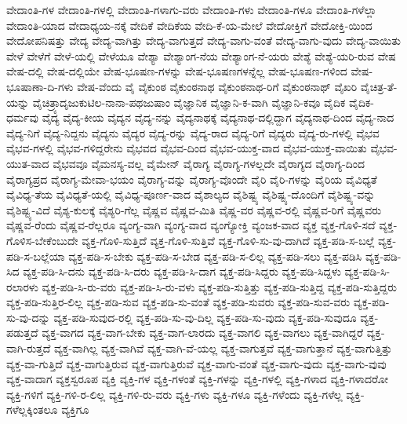 {ವೇದಾಂತಿ-ಗಳ
ವೇದಾಂತಿ-ಗಳಲ್ಲಿ
ವೇದಾಂತಿ-ಗಳಾಗು-ವರು
ವೇದಾಂತಿ-ಗಳು
ವೇದಾಂತಿ-ಗಳೂ
ವೇದಾಂತಿ-ಗಳೆಲ್ಲಾ
ವೇದಾಂತಿ-ಯಾದ
ವೇದಾಧ್ಯಯ-ನಕ್ಕೆ
ವೇದಿಕೆ
ವೇದಿಕೆಯ
ವೇದಿ-ಕೆ-ಯ-ಮೇಲೆ
ವೇದೋಕ್ತಿಗೆ
ವೇದೋಕ್ತಿ-ಯಿಂದ
ವೇದೋಪನಿಷತ್ತು
ವೇದ್ಯ
ವೇದ್ಯ-ವಾಗಿತ್ತು
ವೇದ್ಯ-ವಾಗುತ್ತದೆ
ವೇದ್ಯ-ವಾಗು-ವಂತೆ
ವೇದ್ಯ-ವಾಗು-ವುದು
ವೇದ್ಯ-ವಾಯಿತು
ವೇಳೆ
ವೇಳೆಗೆ
ವೇಳೆ-ಯಲ್ಲಿ
ವೇಳೆಯೂ
ವೇಶ್ಯಾ
ವೇಶ್ಯಾಂಗ-ನೆಯ
ವೇಶ್ಯಾಂಗ-ನೆ-ಯರು
ವೇಶ್ಯೆ
ವೇಶ್ಯೆ-ಯರಿ-ರುವ
ವೇಷ
ವೇಷ-ದಲ್ಲಿ
ವೇಷ-ದಲ್ಲಿಯೇ
ವೇಷ-ಭೂಷಣ-ಗಳನ್ನು
ವೇಷ-ಭೂಷಣಗಳನ್ನೆಲ್ಲ
ವೇಷ-ಭೂಷಣ-ಗಳಿಂದ
ವೇಷ-ಭೂಷಾಣಾ-ದಿ-ಗಳು
ವೇಷ-ವೆಂದು
ವೈ
ವೈಕುಂಠ
ವೈಕುಂಠನಾಥ
ವೈಕುಂಠನಾಥ-ರಿಗೆ
ವೈಕುಂಠನಾಥ್
ವೈಖರಿ
ವೈಚಿತ್ರ-ತೆ-ಯನ್ನು
ವೈಚಿತ್ರ್ಯಾದೃಜುಕುಟಿಲ-ನಾನಾ-ಪಥಜುಷಾಂ
ವೈಜ್ಞಾನಿಕ
ವೈಜ್ಞಾನಿ-ಕ-ವಾಗಿ
ವೈಜ್ಞಾನಿ-ಕವೂ
ವೈದಿಕ
ವೈದಿಕ-ಧರ್ಮವು
ವೈದ್ಯ
ವೈದ್ಯ-ಕೀಯ
ವೈದ್ಯನ
ವೈದ್ಯ-ನನ್ನು
ವೈದ್ಯನಾಥಕ್ಕೆ
ವೈದ್ಯನಾಥ-ದಲ್ಲಿದ್ದಾಗ
ವೈದ್ಯನಾಥ-ದಿಂದ
ವೈದ್ಯ-ನಾದ
ವೈದ್ಯ-ನಿಗೆ
ವೈದ್ಯ-ನಿದ್ದನು
ವೈದ್ಯನು
ವೈದ್ಯರ
ವೈದ್ಯ-ರನ್ನು
ವೈದ್ಯ-ರಾದ
ವೈದ್ಯ-ರಿಗೆ
ವೈದ್ಯರು
ವೈದ್ಯ-ರು-ಗಳಲ್ಲಿ
ವೈಭವ
ವೈಭವ-ಗಳಲ್ಲಿ
ವೈಭವ-ಗಳಿದ್ದರೇನು
ವೈಭವದ
ವೈಭವ-ದಿಂದ
ವೈಭವ-ಯುಕ್ತ-ವಾದ
ವೈಭವ-ಯುಕ್ತ-ವಾಯಿತು
ವೈಭವ-ಯುತ-ವಾದ
ವೈಭವವೂ
ವೈಮನಸ್ಯ-ವಲ್ಲ
ವೈಮೇನ್
ವೈರಾಗ್ಯ
ವೈರಾಗ್ಯ-ಗಳಲ್ಲದೇ
ವೈರಾಗ್ಯದ
ವೈರಾಗ್ಯ-ದಿಂದ
ವೈರಾಗ್ಯಪ್ರದ
ವೈರಾಗ್ಯ-ಮೇವಾ-ಭಯಂ
ವೈರಾಗ್ಯ-ವನ್ನು
ವೈರಾಗ್ಯ-ವೊಂದೇ
ವೈರಿ
ವೈರಿ-ಗಳನ್ನು
ವೈರಿಯ
ವೈವಿಧ್ಯತೆ
ವೈವಿಧ್ಯ-ತೆಯ
ವೈವಿಧ್ಯತೆ-ಯಲ್ಲಿ
ವೈವಿಧ್ಯ-ಪೂರ್ಣ-ವಾದ
ವೈಶಾಲ್ಯದ
ವೈಶಿಷ್ಟ್ಯ
ವೈಶಿಷ್ಟ್ಯ-ದೊಂದಿಗೆ
ವೈಶಿಷ್ಟ್ಯ-ವನ್ನು
ವೈಶಿಷ್ಟ್ಯ-ವಿದೆ
ವೈಶ್ಯ-ಕುಲಕ್ಕೆ
ವೈಶ್ಯರಿ-ಗೆಲ್ಲ
ವೈಷ್ಣವ
ವೈಷ್ಣವ-ಮಿತಿ
ವೈಷ್ಣ-ವರ
ವೈಷ್ಣವ-ರಲ್ಲಿ
ವೈಷ್ಣವ-ರಿಗೆ
ವೈಷ್ಣವರು
ವೈಷ್ಣವ-ರೆಂದು
ವೈಷ್ಣವ-ರೆಲ್ಲರೂ
ವ್ಯಂಗ್ಯ-ವಾಗಿ
ವ್ಯಂಗ್ಯ-ವಾದ
ವ್ಯಂಗ್ಯೋಕ್ತಿ
ವ್ಯಂಜಕ-ವಾದ
ವ್ಯಕ್ತ
ವ್ಯಕ್ತ-ಗೊಳಿ-ಸದೆ
ವ್ಯಕ್ತ-ಗೊಳಿಸ-ಬೇಕೆಂಬುದೇ
ವ್ಯಕ್ತ-ಗೊಳಿ-ಸುತ್ತಿದೆ
ವ್ಯಕ್ತ-ಗೊಳಿ-ಸುತ್ತಿವೆ
ವ್ಯಕ್ತ-ಗೊಳಿ-ಸು-ವು-ದಾಗಿದೆ
ವ್ಯಕ್ತ-ಪಡಿ-ಸ-ಬಲ್ಲೆ
ವ್ಯಕ್ತ-ಪಡಿ-ಸ-ಬಲ್ಲೆಯಾ
ವ್ಯಕ್ತ-ಪಡಿ-ಸ-ಬೇಕು
ವ್ಯಕ್ತ-ಪಡಿ-ಸ-ಬೇಡ
ವ್ಯಕ್ತ-ಪಡಿ-ಸ-ಲಿಲ್ಲ
ವ್ಯಕ್ತ-ಪಡಿ-ಸಲು
ವ್ಯಕ್ತ-ಪಡಿಸಿ
ವ್ಯಕ್ತ-ಪಡಿ-ಸಿದ
ವ್ಯಕ್ತ-ಪಡಿ-ಸಿ-ದನು
ವ್ಯಕ್ತ-ಪಡಿ-ಸಿ-ದರು
ವ್ಯಕ್ತ-ಪಡಿ-ಸಿ-ದಾಗ
ವ್ಯಕ್ತ-ಪಡಿ-ಸಿದ್ದರು
ವ್ಯಕ್ತ-ಪಡಿ-ಸಿದ್ದಳು
ವ್ಯಕ್ತ-ಪಡಿ-ಸಿ-ರಲಾರಳು
ವ್ಯಕ್ತ-ಪಡಿ-ಸಿ-ರು-ವರು
ವ್ಯಕ್ತ-ಪಡಿ-ಸಿ-ರು-ವಳು
ವ್ಯಕ್ತ-ಪಡಿ-ಸುತ್ತಿತ್ತು
ವ್ಯಕ್ತ-ಪಡಿ-ಸುತ್ತಿದ್ದ
ವ್ಯಕ್ತ-ಪಡಿ-ಸುತ್ತಿದ್ದರು
ವ್ಯಕ್ತ-ಪಡಿ-ಸುತ್ತಿರ-ಲಿಲ್ಲ
ವ್ಯಕ್ತ-ಪಡಿ-ಸುವ
ವ್ಯಕ್ತ-ಪಡಿ-ಸು-ವಂತೆ
ವ್ಯಕ್ತ-ಪಡಿ-ಸುವರು
ವ್ಯಕ್ತ-ಪಡಿ-ಸುವ-ವರು
ವ್ಯಕ್ತ-ಪಡಿ-ಸು-ವು-ದನ್ನು
ವ್ಯಕ್ತ-ಪಡಿ-ಸುವುದ-ರಲ್ಲಿ
ವ್ಯಕ್ತ-ಪಡಿ-ಸು-ವು-ದಿಲ್ಲ
ವ್ಯಕ್ತ-ಪಡಿ-ಸು-ವುದು
ವ್ಯಕ್ತ-ಪಡಿ-ಸುವುದೂ
ವ್ಯಕ್ತ-ಪಡುತ್ತದೆ
ವ್ಯಕ್ತ-ವಾಗದ
ವ್ಯಕ್ತ-ವಾಗ-ಬೇಕು
ವ್ಯಕ್ತ-ವಾಗ-ಲಾರದು
ವ್ಯಕ್ತ-ವಾಗಲಿ
ವ್ಯಕ್ತ-ವಾಗಲು
ವ್ಯಕ್ತ-ವಾಗಿದ್ದರೆ
ವ್ಯಕ್ತ-ವಾಗಿ-ರುತ್ತದೆ
ವ್ಯಕ್ತ-ವಾಗಿಲ್ಲ
ವ್ಯಕ್ತ-ವಾಗಿವೆ
ವ್ಯಕ್ತ-ವಾಗಿ-ವೆ-ಯಲ್ಲ
ವ್ಯಕ್ತ-ವಾಗುತ್ತವೆ
ವ್ಯಕ್ತ-ವಾಗುತ್ತಾನೆ
ವ್ಯಕ್ತ-ವಾಗುತ್ತಿತ್ತು
ವ್ಯಕ್ತ-ವಾ-ಗುತ್ತಿದೆ
ವ್ಯಕ್ತ-ವಾಗುತ್ತಿರುವ
ವ್ಯಕ್ತ-ವಾಗುತ್ತಿರುವೆ
ವ್ಯಕ್ತ-ವಾಗು-ವಂತೆ
ವ್ಯಕ್ತ-ವಾಗು-ವುದು
ವ್ಯಕ್ತ-ವಾಗು-ವುವು
ವ್ಯಕ್ತ-ವಾದಾಗ
ವ್ಯಕ್ತಸ್ವರೂಪ
ವ್ಯಕ್ತಿ
ವ್ಯಕ್ತಿ-ಗಳ
ವ್ಯಕ್ತಿ-ಗಳಂತೆ
ವ್ಯಕ್ತಿ-ಗಳನ್ನು
ವ್ಯಕ್ತಿ-ಗಳಲ್ಲಿ
ವ್ಯಕ್ತಿ-ಗಳಾದ
ವ್ಯಕ್ತಿ-ಗಳಾದರೋ
ವ್ಯಕ್ತಿ-ಗಳಿಗೆ
ವ್ಯಕ್ತಿ-ಗಳಿ-ರ-ಲಿಲ್ಲ
ವ್ಯಕ್ತಿ-ಗಳಿ-ರು-ವರು
ವ್ಯಕ್ತಿ-ಗಳು
ವ್ಯಕ್ತಿ-ಗಳೂ
ವ್ಯಕ್ತಿ-ಗಳೆಂದು
ವ್ಯಕ್ತಿ-ಗಳೆಲ್ಲ
ವ್ಯಕ್ತಿ-ಗಳೆಲ್ಲಕ್ಕಿಂತಲೂ
ವ್ಯಕ್ತಿಗೂ
}
